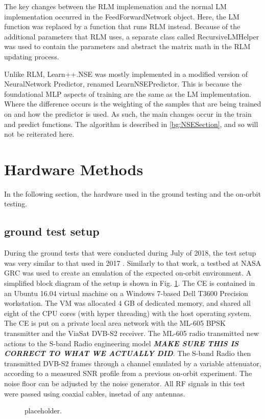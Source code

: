 \par The key changes between the RLM implemenation and the normal LM implementation occurred in the FeedForwardNetwork object. Here, the LM function was replaced by a function that runs RLM instead. Because of the additional parameters that RLM uses, a separate class called RecursiveLMHelper was used to contain the parameters and abstract the matrix math in the RLM updating process.

\par Unlike RLM, Learn++.NSE was mostly implemented in a modified version of NeuralNetwork Predictor, renamed LearnNSEPredictor. This is because the foundational MLP aspects of training are the same as the LM implementation. Where the difference occurs is the weighting of the samples that are being trained on and how the predictor is used. As such, the main changes occur in the train and predict functions. The algorithm is described in \ref{bg:NSESection}, and so will not be reiterated here.
\section{Hardware Methods}\label{BG:hardware}
\par In the following section, the hardware used in the ground testing and the on-orbit testing.
\subsection{ground test setup}

\par During the ground tests that were conducted during July of 2018, the test setup was very similar to that used in 2017 \cite{tim_implementation}.  Similarly to that work, a testbed at NASA GRC was used to create an emulation of the expected on-orbit environment. A simplified block diagram of the setup is shown in Fig. \ref{methods:groundTestFig}. The CE is contained in an Ubuntu 16.04 virtual machine on a Windows 7-based Dell T3600 Precision workstation. The VM was allocated 4 GB of dedicated memory, and shared all eight of the CPU cores (with hyper threading) with the host operating system. The CE is put on a private local area network with the ML-605 BPSK transmitter and the ViaSat DVB-S2 receiver. The ML-605 radio transmitted new actions to the S-band Radio engineering model \textbf{\textit{MAKE SURE THIS IS CORRECT TO WHAT WE ACTUALLY DID}}. The S-band Radio then transmitted DVB-S2 frames through a channel emulated by a variable attenuator, according to a measured SNR profile from a previous on-orbit experiment. The noise floor can be adjusted by the noise generator. All RF signals in this test were passed using coaxial cables, insetad of any antennas.
\begin{figure}[ht]
\label{methods:groundTestFig}
\caption{placeholder.}
\end{figure} 


